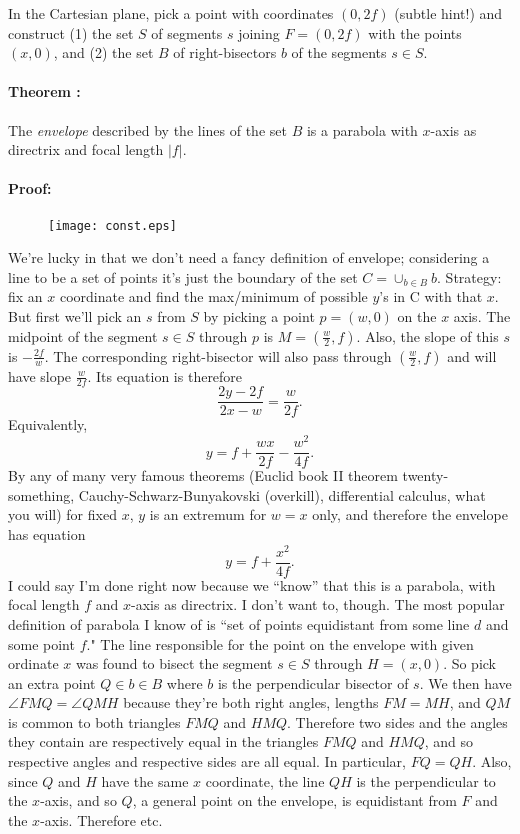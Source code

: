 \documentclass[12pt]{article}
\newcounter{tnum}
\newcommand{\theorem}[1]{\paragraph{Theorem \arabic{tnum} #1:} \addtocounter{tnum}{1}}
\newcommand{\proof}{\paragraph{Proof:}}
\begin{document}
In the Cartesian plane, pick a point with coordinates $(0,2f)$ (subtle hint!) and construct (1) the set $S$ of segments $s$ joining $F = (0,2f)$ with the 
points $(x,0)$, and (2) the set $B$ of right-bisectors $b$ of the segments $s\in S$.  
\theorem{}
The {\em envelope} described by the lines of the set $B$ is a parabola with $x$-axis as directrix and focal length $\vert f\vert$.
\proof
\begin{figure}
\begin{center}
\texttt{[image: const.eps]}
\end{center}
\end{figure}
We're lucky in that we don't need a fancy definition of envelope; considering a line to be a set of points it's just the boundary of the set 
$C=\cup_{b\in B} b$.  Strategy:  fix an $x$ coordinate and find the max/minimum of possible $y$'s in C with that $x$.  But first we'll pick an $s$ from 
$S$ by picking a point $p = (w,0)$ on the $x$ axis.  The midpoint of the segment $s\in S$ through $p$ is $M = (\frac{w}{2},f)$.  Also, the slope of this 
$s$ is $-\frac{2f}{w}$.  The corresponding right-bisector will also pass through $(\frac{w}{2},f)$ and will have slope $\frac{w}{2f}$.  Its equation is therefore
\[ \frac{2y-2f}{2x-w} = \frac{w}{2f}.\]
Equivalently,
\[ y = f + \frac{wx}{2f} - \frac{w^2}{4f}.\]
By any of many very famous theorems (Euclid book II theorem twenty-something, Cauchy-Schwarz-Bunyakovski (overkill), differential calculus, what 
you will) for fixed $x$, $y$ is an extremum for $w = x$ only, and therefore the envelope has equation
\[ y = f + \frac{x^2}{4f}.\]
I could say I'm done right now because we ``know'' that this is a parabola, with focal length $f$ and $x$-axis as directrix.  I don't want to, though.  The 
most popular definition of parabola I know of is ``set of points equidistant from some line $d$ and some point $f$."  The line responsible for the point on 
the envelope with given ordinate $x$ was found to bisect the segment $s\in S$ through $H = (x,0)$.  So pick an extra point $Q\in b\in B$ where $b$ is 
the perpendicular bisector of $s$.  We then have $\angle FMQ = \angle QMH$ because they're both right angles, lengths $FM = MH$, and $QM$ is 
common to both triangles $FMQ$ and $HMQ$.  Therefore two sides and the angles they contain are respectively equal in the triangles $FMQ$ and 
$HMQ$, and so respective angles and respective sides are all equal.  In particular, $FQ = QH$.  Also, since $Q$ and $H$ have the same $x$ 
coordinate, the line $QH$ is the perpendicular to the $x$-axis, and so $Q$, a general point on the envelope, is equidistant from $F$ and the $x$-axis.  
Therefore etc.
\end{document}
